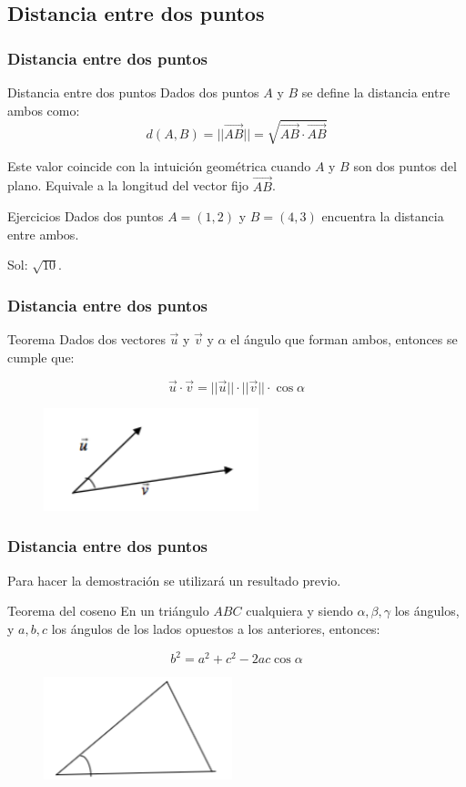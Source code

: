 \documentclass{beamer}
\begin{document}
\subsection{Distancia entre dos puntos}


\begin{frame}
  \frametitle{Distancia entre dos puntos}
    \begin{block}{Distancia entre dos puntos}
Dados dos puntos $A$ y $B$ se define la distancia entre ambos como:
\[d(A,B) = ||\vec{AB}|| = \sqrt{\vec{AB}\cdot\vec{AB}}\]
 \end{block}
Este valor coincide con la intuici\'on geom\'etrica cuando $A$ y $B$ son dos puntos del plano. Equivale a la longitud del vector fijo $\vec{AB}$.

    \begin{block}{Ejercicios}
Dados dos puntos $A=(1,2)$ y $B=(4,3)$ encuentra la distancia entre ambos.
 \end{block}
 Sol: $\sqrt{10}$.
\end{frame}

\begin{frame}
  \frametitle{Distancia entre dos puntos}
    \begin{block}{Teorema}
Dados dos vectores $\vec u$ y $\vec v$  y $\alpha$ el \'angulo que forman ambos, entonces se cumple que:

\[\vec u \cdot \vec v = ||\vec u ||\cdot ||\vec v||\cdot  \cos \alpha\]
 \end{block}

\begin{figure}[h]
    \label{fig:teorema del coseno}
\centering
\includegraphics[height=3cm]{th_cos}
\end{figure}
\end{frame}

\begin{frame}
  \frametitle{Distancia entre dos puntos}
  Para hacer la demostraci\'on se utilizar\'a un resultado previo.
    \begin{block}{Teorema del coseno}
En un tri\'angulo $ABC$ cualquiera y siendo $\alpha,\beta,\gamma$ los \'angulos, y $a,b,c$ los \'angulos de los lados opuestos a los anteriores, entonces:

\[b^2=a^2+c^2-2ac\cos\alpha\]
 \end{block}

\begin{figure}[h]
    \label{fig:triangulo}
\centering
\includegraphics[height=3cm]{triangle}
\end{figure}
\end{frame}
\end{document}

